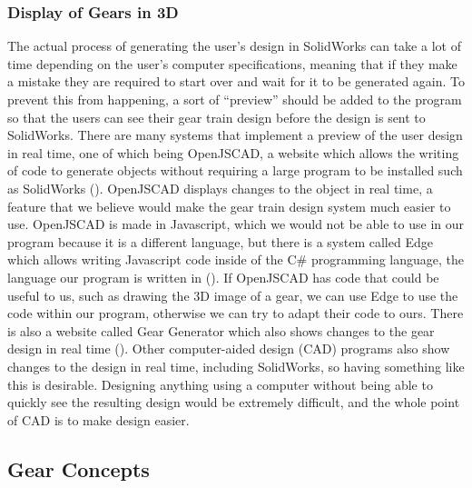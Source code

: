 \begin{doublespace}
\subsubsection{Display of Gears in 3D}

The actual process of generating the user's design in SolidWorks can take a lot of time depending on the user's computer specifications, meaning that if they make a mistake they are required to start over and wait for it to be generated again. To prevent this from happening, a sort of ``preview'' should be added to the program so that the users can see their gear train design before the design is sent to SolidWorks. There are many systems that implement a preview of the user design in real time, one of which being OpenJSCAD, a website which allows the writing of code to generate objects without requiring a large program to be installed such as SolidWorks (\cite{mueller_openjscad_2018}). OpenJSCAD displays changes to the object in real time, a feature that we believe would make the gear train design system much easier to use. OpenJSCAD is made in Javascript, which we would not be able to use in our program because it is a different language, but there is a system called Edge which allows writing Javascript code inside of the C\# programming language, the language our program is written in (\cite{janczuk_edgejs_2017}). If OpenJSCAD has code that could be useful to us, such as drawing the 3D image of a gear, we can use Edge to use the code within our program, otherwise we can try to adapt their code to ours. There is also a website called Gear Generator which also shows changes to the gear design in real time (\cite{vincze_involute_2014}). Other computer-aided design (CAD) programs also show changes to the design in real time, including SolidWorks, so having something like this is desirable. Designing anything using a computer without being able to quickly see the resulting design would be extremely difficult, and the whole point of CAD is to make design easier.

\subsection{Gear Concepts}


\end{doublespace}
